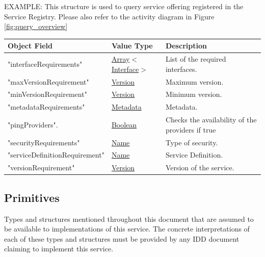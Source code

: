 \documentclass[a4paper]{arrowhead}
\newcommand{\pref}[1]{{\textcolor{ArrowheadGrey}{\hyperref[sec:model:primitives:#1]{#1}}}}
\begin{document}
\newpage

\color{red} 


EXAMPLE: This structure is used to query service offering registered in
the Service Registry. Please also refer to the activity diagram in
Figure \ref{fig:query_overview} \color{black}

\begin{table}[ht!]
\begin{tabularx}{\textwidth}{| p{5cm} | p{3.5cm} | X |} \hline
\rowcolor{gray!33} Object Field & Value Type      & Description \\ \hline
"interfaceRequirements"                   & \pref{Array}$<$\pref{Interface}$>$     & List of the required interfaces. \\ \hline
"maxVersionRequirement"                & \pref{Version}     & Maximum version. \\ \hline
"minVersionRequirement"                & \pref{Version}     & Minimum version. \\ \hline
"metadataRequirements"                  & \pref{Metadata}     & Metadata. \\ \hline
"pingProviders".                    & \pref{Boolean} & Checks the availability of the providers if true \\ \hline
"securityRequirements"                    &\pref{Name}  & Type of security. \\ \hline
"serviceDefinitionRequirement"         &\pref{Name}        & Service Definition. \\ \hline
"versionRequirement"                   &\pref{Version}     & Version of the service. \\ \hline
\end{tabularx}
\end{table}

\newpage

\subsection{Primitives}
\label{sec:model:primitives}

Types and structures mentioned throughout this document that are assumed to be available to implementations of this service.
The concrete interpretations of each of these types and structures must be provided by any IDD document claiming to implement this service.
\end{document}
